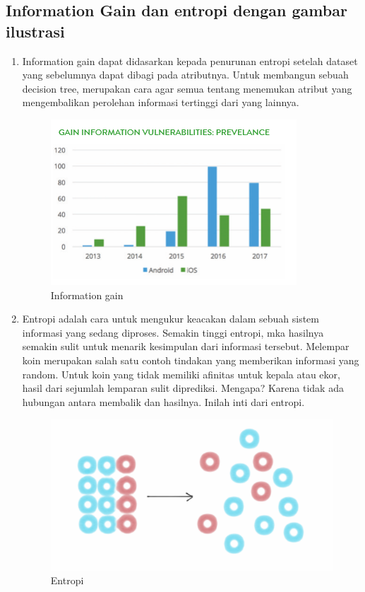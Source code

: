 \subsection{Information Gain dan entropi dengan gambar ilustrasi}
\begin{enumerate}
\item Information gain dapat didasarkan kepada penurunan entropi setelah dataset yang sebelumnya dapat dibagi pada atributnya. Untuk membangun sebuah decision tree, merupakan cara agar semua tentang menemukan atribut yang mengembalikan perolehan informasi tertinggi dari yang lainnya.
\begin{figure}[ht]
\centering
\includegraphics[scale=0.5]{figures/8mrdt.png}
\caption{Information gain}
\label{contoh}
\end{figure}
\item Entropi adalah cara untuk mengukur keacakan dalam sebuah sistem informasi yang sedang diproses. Semakin tinggi entropi, mka hasilnya semakin sulit untuk menarik kesimpulan dari informasi tersebut. Melempar koin merupakan salah satu contoh tindakan yang memberikan informasi yang random. Untuk koin yang tidak memiliki afinitas untuk kepala atau ekor, hasil dari sejumlah lemparan sulit diprediksi. Mengapa? Karena tidak ada hubungan antara membalik dan hasilnya. Inilah inti dari entropi.
\begin{figure}[ht]
\centering
\includegraphics[scale=0.5]{figures/9mrdt.png}
\caption{Entropi}
\label{contoh}
\end{figure}
\end{enumerate}

 